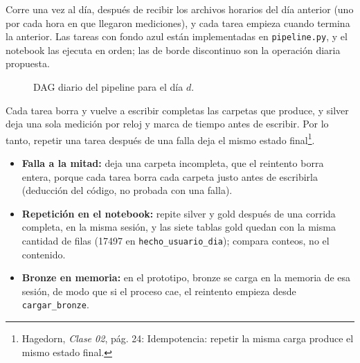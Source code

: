 \documentclass[11pt]{article}
\begin{document}
 Corre una vez al día, después de recibir los archivos
horarios del día anterior (uno por cada hora en que llegaron mediciones), y cada tarea empieza cuando termina la anterior.
Las tareas con fondo azul están implementadas en \texttt{pipeline.py}, y el
notebook las ejecuta en orden; las de borde discontinuo son la operación diaria
propuesta.

\begin{figure}[H]
\centering
{}
\caption{DAG diario del pipeline para el día $d$.}
\end{figure}

 Cada tarea borra y vuelve a escribir completas las
carpetas que produce, y silver deja una sola medición por reloj y marca de
tiempo antes de escribir. Por lo tanto, repetir una tarea después de una falla
deja el mismo estado final\footnote{Hagedorn, \emph{Clase 02}, pág. 24:
\textquotedbl{}Idempotencia: repetir la misma carga produce el mismo estado
final\textquotedbl{}.}.
\begin{itemize}
  \item \textbf{Falla a la mitad:} deja una carpeta incompleta, que el
  reintento borra entera, porque cada tarea borra cada carpeta justo antes de
  escribirla (deducción del código, no probada con una falla).
  \item \textbf{Repetición en el notebook:} repite silver y gold después de
  una corrida completa, en la misma sesión, y las siete tablas gold quedan
  con la misma cantidad de filas (17497 en \texttt{hecho\_usuario\_dia});
  compara conteos, no el contenido.
  \item \textbf{Bronze en memoria:} en el prototipo, bronze se carga en la
  memoria de esa sesión, de modo que si el proceso cae, el reintento empieza
  desde \texttt{cargar\_bronze}.
\end{itemize}
\end{document}
